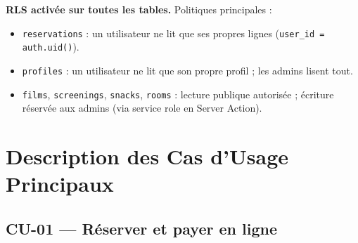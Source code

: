 \documentclass[12pt,a4paper,openany]{report}
\begin{document}
\begin{notebox}
\textbf{RLS activée sur toutes les tables.} Politiques principales :
\begin{itemize}[noitemsep]
  \item \texttt{reservations} : un utilisateur ne lit que ses propres lignes (\texttt{user\_id = auth.uid()}).
  \item \texttt{profiles} : un utilisateur ne lit que son propre profil ; les admins lisent tout.
  \item \texttt{films}, \texttt{screenings}, \texttt{snacks}, \texttt{rooms} : lecture publique autorisée ; écriture réservée aux admins (via service role en Server Action).
\end{itemize}
\end{notebox}

\chapter{Description des Cas d'Usage Principaux}

\section{CU-01 — Réserver et payer en ligne}
\end{document}
